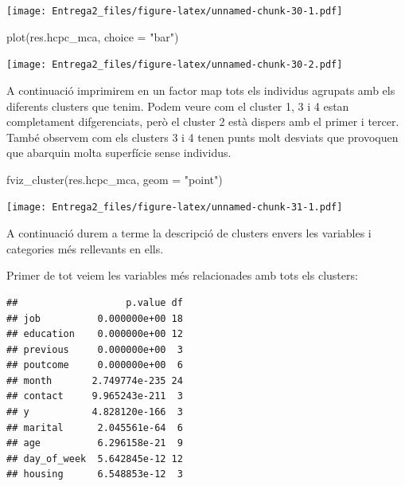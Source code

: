 \documentclass[
]{article}
\newenvironment{Shaded}{\begin{snugshade}}{\end{snugshade}}
\newcommand{\AttributeTok}[1]{\textcolor[rgb]{0.77,0.63,0.00}{#1}}
\newcommand{\FunctionTok}[1]{\textcolor[rgb]{0.00,0.00,0.00}{#1}}
\newcommand{\NormalTok}[1]{#1}
\newcommand{\SpecialCharTok}[1]{\textcolor[rgb]{0.00,0.00,0.00}{#1}}
\newcommand{\StringTok}[1]{\textcolor[rgb]{0.31,0.60,0.02}{#1}}
\begin{document}
\texttt{[image: Entrega2\_files/figure-latex/unnamed-chunk-30-1.pdf]}

\begin{Shaded}
\begin{Highlighting}[]
\FunctionTok{plot}\NormalTok{(res.hcpc\_mca, }\AttributeTok{choice =} \StringTok{"bar"}\NormalTok{)}
\end{Highlighting}
\end{Shaded}

\texttt{[image: Entrega2\_files/figure-latex/unnamed-chunk-30-2.pdf]}

A continuació imprimirem en un factor map tots els individus agrupats
amb els diferents clusters que tenim. Podem veure com el cluster 1, 3 i
4 estan completament difgerenciats, però el cluster 2 està dispers amb
el primer i tercer. També observem com els clusters 3 i 4 tenen punts
molt desviats que provoquen que abarquin molta superfície sense
individus.

\begin{Shaded}
\begin{Highlighting}[]
\FunctionTok{fviz\_cluster}\NormalTok{(res.hcpc\_mca, }\AttributeTok{geom =} \StringTok{"point"}\NormalTok{)}
\end{Highlighting}
\end{Shaded}

\texttt{[image: Entrega2\_files/figure-latex/unnamed-chunk-31-1.pdf]}

A continuació durem a terme la descripció de clusters envers les
variables i categories més rellevants en ells.

Primer de tot veiem les variables més relacionades amb tots els
clusters:

\begin{Shaded}
\end{Shaded}

\begin{verbatim}
##                   p.value df
## job          0.000000e+00 18
## education    0.000000e+00 12
## previous     0.000000e+00  3
## poutcome     0.000000e+00  6
## month       2.749774e-235 24
## contact     9.965243e-211  3
## y           4.828120e-166  3
## marital      2.045561e-64  6
## age          6.296158e-21  9
## day_of_week  5.642845e-12 12
## housing      6.548853e-12  3
\end{verbatim}
\end{document}

